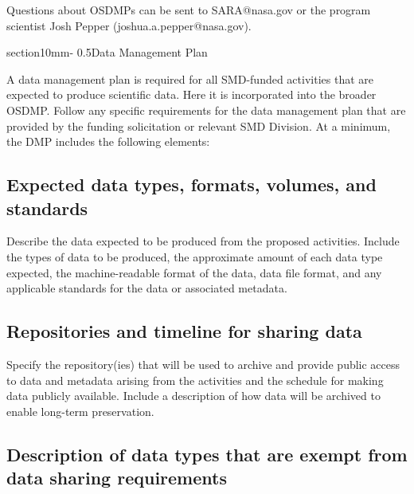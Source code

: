 \documentclass[letterpaper,12pt]{article}
\makeatletter
\renewcommand{\section}{\@startsection%
{section}{1}{0mm}{-\baselineskip}%
{0.5\baselineskip}{\normalfont\Large\bfseries}}%
\makeatother
\begin{document}
Questions about OSDMPs can be sent to SARA@nasa.gov or the program scientist Josh Pepper (joshua.a.pepper@nasa.gov).



\section{Data Management Plan}

A data management plan is required for all SMD-funded activities that are expected to produce scientific data. Here it is incorporated into the broader OSDMP. Follow any specific requirements for the data management plan that are provided by the funding solicitation or relevant SMD Division. At a minimum, the DMP includes the following elements:

\subsection{Expected data types, formats, volumes, and standards}

Describe the data expected to be produced from the proposed activities. Include the types of data to be produced, the approximate amount of each data type expected, the machine-readable format of the data, data file format, and any applicable standards for the data or associated metadata.

\subsection{Repositories and timeline for sharing data}

Specify the repository(ies) that will be used to archive and provide public access to data and metadata arising from the activities and the schedule for making data publicly available. Include a description of how data will be archived to enable long-term preservation.

\subsection{Description of data types that are exempt from data sharing requirements}
\end{document}
